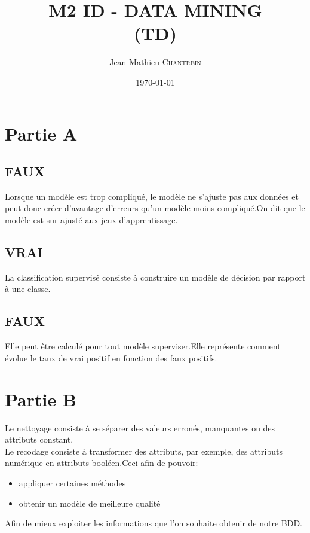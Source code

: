 \documentclass[a4paper,11pt]{article}
\title{M2 ID - DATA MINING \\ \normalsize (TD)}
\author{Jean-Mathieu \textsc{Chantrein}}
\date{\today}
\begin{document}
	\renewcommand{\headrulewidth}{0.001pt}
	
	\pagestyle{fancy}
	
	\maketitle


\section{Partie A}
\subsection{FAUX}
Lorsque un modèle est trop compliqué, le modèle ne s'ajuste pas aux données et peut donc créer d'avantage d'erreurs qu'un modèle moins compliqué.On dit que le modèle est sur-ajusté aux jeux d'apprentissage.

\subsection{VRAI}
La classification supervisé consiste à construire un modèle de décision par rapport à une classe.

\subsection{FAUX}
Elle peut être calculé pour tout modèle superviser.Elle représente comment évolue le taux de vrai positif en fonction des faux positifs.

\section{Partie B}
Le nettoyage consiste à se séparer des valeurs erronés, manquantes ou des attributs constant.\\
Le recodage consiste à transformer des attributs, par exemple, des attributs numérique en attributs booléen.Ceci afin de pouvoir:
\begin{itemize}
\item appliquer certaines méthodes
\item obtenir un modèle de meilleure qualité
\end{itemize} Afin de mieux exploiter les informations que l'on souhaite obtenir de notre BDD.
\end{document}
